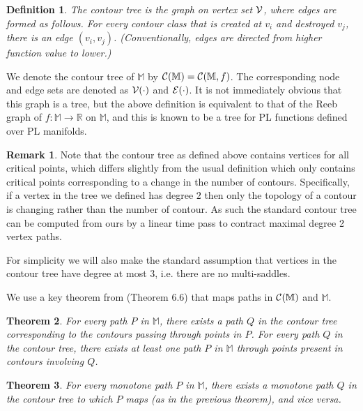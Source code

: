 \documentclass[11pt]{article}
\newtheorem{theorem}{Theorem}
\newtheorem{definition}[theorem]{Definition}
\theoremstyle{definition}
\newtheorem{remark}{Remark}
\newcommand{\cC}{{\cal C}}
\newcommand{\cE}{{\cal E}}
\newcommand{\cV}{{\cal V}}
\newcommand{\MM}{\mathbb{M}}
\newcommand{\RR}{\mathbb{R}}
\newcommand{\reeb}{\cC}
\begin{document}
\begin{definition} \label{def:tree} The contour tree is the graph on vertex set $\cV$, where
edges are formed as follows. For every contour class that is created at $v_i$ and destroyed $v_j$,
there is an edge $(v_i,v_j)$. (Conventionally, edges are directed from higher function value to lower.)
\end{definition}

We denote the contour tree of $\MM$
by $\reeb(\MM) = \reeb(\MM,f)$. The corresponding node and edge sets are denoted as $\cV(\cdot)$ and $\cE(\cdot)$.
%
It is not immediately obvious that this graph is a tree, but the above definition is equivalent to that of the Reeb graph of $f:\MM \rightarrow \RR$ on $\MM$, and this is known to be a tree for PL functions defined over PL manifolds.  

\begin{remark}
Note that the contour tree as defined above contains vertices for all critical points, 
which differs slightly from the usual definition which only contains critical points corresponding to a change in the number of contours.  Specifically, if a vertex in the tree we defined has degree $2$ then only the topology of a contour is changing rather than the number of contour.  As such the standard contour tree can be computed from ours by a linear time pass to contract maximal degree 2 vertex paths.

For simplicity we will also make the standard assumption that vertices in the contour 
tree have degree at most $3$, i.e. there are no multi-saddles.
\end{remark}


We use a key theorem from \cite{c-tmi-04} (Theorem 6.6) that maps paths in $\cC(\MM)$ and $\MM$.


\begin{theorem} \label{thm:carr-path} For every path $P$ in $\MM$, there exists a path $Q$ in the contour tree corresponding
to the contours passing through points in $P$.
For every path $Q$ in the contour tree, there exists at least one path $P$ in $\MM$ through points present
in contours involving $Q$.
\end{theorem}

\begin{theorem} \label{thm:carr-mono} For every monotone path $P$ in $\MM$, there exists a monotone path $Q$ in the contour tree to which $P$
maps (as in the previous theorem), and vice versa.
\end{theorem}
\end{document}
